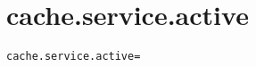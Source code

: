 \section{cache.service.active}
\label{configuration:CacheServiceActive}
\ClearAPI
\TODO
\begin{lstlisting}[style=Props,caption={Usage example for \textit{cache.service.active}}]
cache.service.active=
\end{lstlisting}